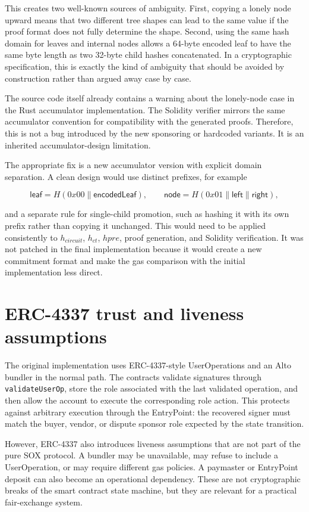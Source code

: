 This creates two well-known sources of ambiguity. First, copying a lonely node upward means
that two different tree shapes can lead to the same value if the proof format does not
fully determine the shape. Second, using the same hash domain for leaves and internal nodes
allows a 64-byte encoded leaf to have the same byte length as two 32-byte child hashes
concatenated. In a cryptographic specification, this is exactly the kind of ambiguity that
should be avoided by construction rather than argued away case by case.

The source code itself already contains a warning about the lonely-node case in the Rust
accumulator implementation. The Solidity verifier mirrors the same accumulator convention
for compatibility with the generated proofs. Therefore, this is not a bug introduced by the
new sponsoring or hardcoded variants. It is an inherited accumulator-design limitation.

The appropriate fix is a new accumulator version with explicit domain separation. A clean
design would use distinct prefixes, for example

\[
  \mathsf{leaf} = H(0x00 \parallel \mathsf{encodedLeaf}), \qquad
  \mathsf{node} = H(0x01 \parallel \mathsf{left} \parallel \mathsf{right}),
\]

and a separate rule for single-child promotion, such as hashing it with its own prefix
rather than copying it unchanged. This would need to be applied consistently to
\(h_{\mathit{circuit}}\), \(h_{\mathit{ct}}\), \(hpre\), proof generation, and Solidity
verification. It was not patched in the final implementation because it would create a new
commitment format and make the gas comparison with the initial implementation less direct.

\section{ERC-4337 trust and liveness assumptions}

The original implementation uses ERC-4337-style UserOperations and an Alto bundler in the
normal path. The contracts validate signatures through \texttt{validateUserOp}, store the
role associated with the last validated operation, and then allow the account to execute the
corresponding role action. This protects against arbitrary execution through the EntryPoint:
the recovered signer must match the buyer, vendor, or dispute sponsor role expected by the
state transition.

However, ERC-4337 also introduces liveness assumptions that are not part of the pure SOX
protocol. A bundler may be unavailable, may refuse to include a UserOperation, or may require
different gas policies. A paymaster or EntryPoint deposit can also become an operational
dependency. These are not cryptographic breaks of the smart contract state machine, but
they are relevant for a practical fair-exchange system.

